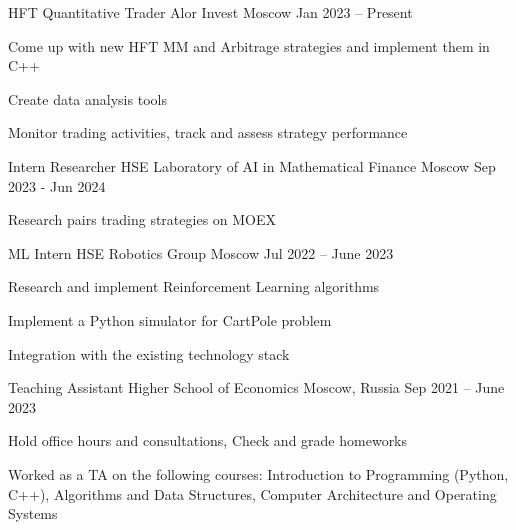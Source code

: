 \documentclass[a4paper, 10pt]{awesome-cv}
\begin{document}
\vspace{-5mm}
\begin{cventries}
	\cventry
	{HFT Quantitative Trader}
	{Alor Invest}
	{Moscow}
	{Jan 2023 – Present}
	{\begin{cvitems}
			\item {Come up with new HFT MM and Arbitrage strategies and implement them in C++}
			\item {Create data analysis tools}
			\item {Monitor trading activities, track and assess strategy performance}
		\end{cvitems}}

	\cventry
	{Intern Researcher}
	{HSE Laboratory of AI in Mathematical Finance}
	{Moscow}
	{Sep 2023 - Jun 2024}
	{\begin{cvitems}
			\item{Research pairs trading strategies on MOEX}
		\end{cvitems}
	}

	\cventry
	{ML Intern}
	{HSE Robotics Group}
	{Moscow}
	{Jul 2022 – June 2023}
	{\begin{cvitems}
			\item {Research and implement Reinforcement Learning algorithms}
			\item {Implement a Python simulator for CartPole problem}
			\item {Integration with the existing technology stack}
		\end{cvitems}}

	\cventry
	{Teaching Assistant}
	{Higher School of Economics}
	{Moscow, Russia}
	{Sep 2021 – June 2023}
	{\begin{cvitems}
			\item {Hold office hours and consultations, Check and grade homeworks}
			\item {Worked as a TA on the following courses: Introduction to Programming (Python, C++), Algorithms and Data Structures, Computer Architecture and Operating Systems}
		\end{cvitems}}
\end{cventries}
\end{document}
